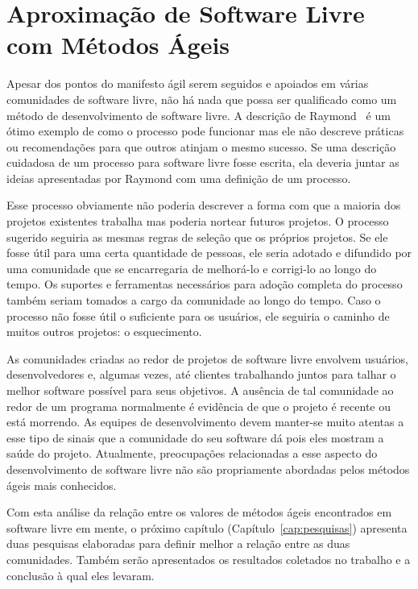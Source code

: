 \section{Aproximação de Software Livre com Métodos Ágeis}
\label{sec:agile?}

Apesar dos pontos do manifesto ágil serem seguidos e apoiados em
várias comunidades de software livre, não há nada que possa ser
qualificado como um método de desenvolvimento de software livre. A
descrição de Raymond~\cite{Raymond1999} é um ótimo exemplo de como o
processo pode funcionar mas ele não descreve práticas ou recomendações
para que outros atinjam o mesmo sucesso. Se uma descrição cuidadosa de
um processo para software livre fosse escrita, ela deveria juntar as
ideias apresentadas por Raymond com uma definição de um processo.

Esse processo obviamente não poderia descrever a forma com que a
maioria dos projetos existentes trabalha mas poderia nortear futuros
projetos. O processo sugerido seguiria as mesmas regras de seleção que
os próprios projetos. Se ele fosse útil para uma certa quantidade de
pessoas, ele seria adotado e difundido por uma comunidade que se
encarregaria de melhorá-lo e corrigi-lo ao longo do tempo. Os suportes
e ferramentas necessários para adoção completa do processo também
seriam tomados a cargo da comunidade ao longo do tempo. Caso o
processo não fosse útil o suficiente para os usuários, ele seguiria o
caminho de muitos outros projetos: o esquecimento.

As comunidades criadas ao redor de projetos de software livre envolvem
usuários, desenvolvedores e, algumas vezes, até clientes trabalhando
juntos para talhar o melhor software possível para seus objetivos. A
ausência de tal comunidade ao redor de um programa normalmente é
evidência de que o projeto é recente ou está morrendo. As equipes de
desenvolvimento devem manter-se muito atentas a esse tipo de sinais
que a comunidade do seu software dá pois eles mostram a saúde do
projeto. Atualmente, preocupações relacionadas a esse aspecto do
desenvolvimento de software livre não são propriamente abordadas pelos
métodos ágeis mais conhecidos.

Com esta análise da relação entre os valores de métodos ágeis
encontrados em software livre em mente, o próximo capítulo
(Capítulo~\ref{cap:pesquisas}) apresenta duas pesquisas elaboradas
para definir melhor a relação entre as duas comunidades. Também serão
apresentados os resultados coletados no trabalho e a conclusão à qual
eles levaram.
